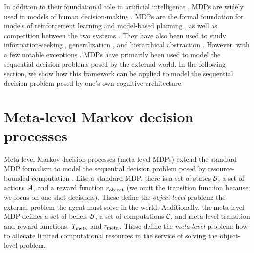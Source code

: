 
In addition to their foundational role in artificial intelligence \citep{sutton2018reinforcement}, MDPs are widely used in models of human decision-making \citep{dayan2008decision}. MDPs are the formal foundation for models of reinforcement learning \citep{niv2009reinforcement} and model-based planning \citep{huys2015interplay,botvinick2012planning}, as well as competition between the two systems \citep{daw2005uncertaintybased,keramati2011speed,kool2017costbenefit}. They have also been used to study information-seeking \citep{gottlieb2013informationseeking,hunt2016approachinduced}, generalization \citep{tomov2021multi}, and hierarchical abstraction \citep{solway2014optimal,botvinick2009hierarchically}. However, with a few notable exceptions \citep{dayan2008serotonin,drugowitsch2012cost,tajima2016optimal}, MDPs have primarily been used to model the sequential decision problems posed by the external world. In the following section, we show how this framework can be applied to model the sequential decision problem posed by one's own cognitive architecture.

\section{Meta-level Markov decision processes}


Meta-level Markov decision processes (meta-level MDPs) extend the standard MDP formalism to model the sequential decision problem posed by resource-bounded computation \citep{hay2012selecting}. Like a standard MDP, there is a set of states $\S$, a set of actions $\A$, and a reward function $r\object$ (we omit the transition function because we focus on one-shot decisions). These define the \emph{object-level} problem: the external problem the agent must solve in the world. Additionally, the meta-level MDP defines a set of beliefs $\B$, a set of computations $\C$, and meta-level transition and reward functions, $T\meta$ and $r\meta$. These define the \emph{meta-level} problem: how to allocate limited computational resources in the service of solving the object-level problem.

